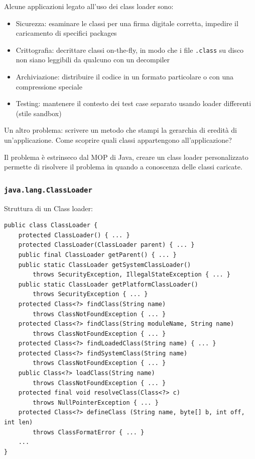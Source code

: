 Alcune applicazioni legato all'uso dei class loader sono:
\begin{itemize}
    \item Sicurezza: esaminare le classi per una firma digitale corretta, impedire il caricamento di specifici packages

    \item Crittografia: decrittare classi on-the-fly, in modo che i file \texttt{.class} su disco non siano leggibili da qualcuno con un decompiler

    \item Archiviazione: distribuire il codice in un formato particolare o con una compressione speciale

    \item Testing: mantenere il contesto dei test case separato usando loader differenti (stile sandbox)
\end{itemize}

Un altro problema: scrivere un metodo che stampi la gerarchia di eredità di un'applicazione. Come scoprire quali classi appartengono all'applicazione?

Il problema è estrinseco dal MOP di Java, creare un class loader personalizzato permette di risolvere il problema in quando a conoscenza delle classi caricate.

\subsubsection{\texttt{java.lang.ClassLoader}}

Struttura di un Class loader:
\begin{verbatim}
public class ClassLoader {
    protected ClassLoader() { ... }
    protected ClassLoader(ClassLoader parent) { ... }
    public final ClassLoader getParent() { ... }
    public static ClassLoader getSystemClassLoader()
        throws SecurityException, IllegalStateException { ... }
    public static ClassLoader getPlatformClassLoader()
        throws SecurityException { ... }
    protected Class<?> findClass(String name)
        throws ClassNotFoundException { ... }
    protected Class<?> findClass(String moduleName, String name)
        throws ClassNotFoundException { ... }
    protected Class<?> findLoadedClass(String name) { ... }
    protected Class<?> findSystemClass(String name)
        throws ClassNotFoundException { ... }
    public Class<?> loadClass(String name)
        throws ClassNotFoundException { ... }
    protected final void resolveClass(Class<?> c)
        throws NullPointerException { ... }
    protected Class<?> defineClass (String name, byte[] b, int off, int len)
        throws ClassFormatError { ... }
    ...
}
\end{verbatim}

